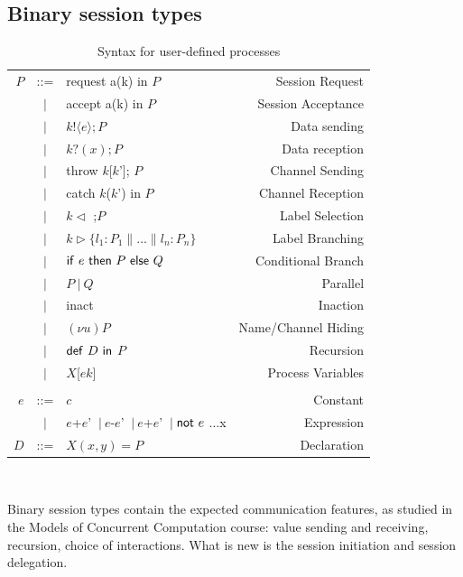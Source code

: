\documentclass[a4paper,11pt,twoside]{report}
\newcommand{\ptilde}[1]{{\ensuremath{#1}}}
\newcommand{\kf}[1]{\textup{\textsf{#1}}\xspace}
\newcommand{\Ic}{\ensuremath{c}}
\newcommand{\Iu}{\ensuremath{u}}
\newcommand{\Ik}{\ensuremath{k}}
\newcommand{\PP}{\ensuremath{P}}
\newcommand{\Q}{\ensuremath{Q}}
\newcommand{\DD}{\ensuremath{D}}
\newcommand{\e}{\ensuremath{e}}
\newcommand{\x}{\ensuremath{x}}
\newcommand{\pc}{\Par}
\newcommand{\X}{\ensuremath{X}}
\newcommand{\Xsignature}{\ensuremath{\X(\at{x}, \at{y})}}
\newcommand{\Ddef}{\ensuremath{\Xsignature=\PP}}
\newcommand{\defD}{\ensuremath{\kf{def}\ \DD \ \kf{in}\ }}
\newcommand{\ifthenelse}[3]{\ensuremath{\kf{if}\ #1\ \kf{then}\ #2\ \kf{else}\ #3}}
\newcommand{\nuc}[2]{\ensuremath{(\nu #1)#2}}
\newcommand{\NOT}[1]{\ensuremath{\kf{not}\ #1}}
\newcommand{\at}[1]{\ensuremath{\ptilde{#1}}}
\newcommand{\Par}{\ensuremath{\ |\ }}
\newcommand{\sep}{\ensuremath{~\mathbf{|}~ }}
\newcommand{\outS}[3]{\ensuremath{#1!\langle #2\rangle;#3}}
\newcommand{\inpS}[3]{\ensuremath{#1?( #2);#3}}
\begin{document}
\subsection{Binary session types}
\begin{table}[tb]
\centering
\begin{tabular}{rclr}
 \PP & ::=  &  request a(k) in \PP   &   {Session Request}\\
     & \sep & accept a(k) in \PP   &   {Session Acceptance}\\
     & \sep & \outS{\Ik}\e\PP &    {Data sending}\\
     & \sep & \inpS{\Ik}\x\PP &    {Data reception}\\
     & \sep & throw \Ik[\Ik']; \PP & {Channel Sending}\\
     & \sep & catch \Ik(\Ik') in \PP &  {Channel Reception}\\
     & \sep & \Ik $\vartriangleleft$ ;{\PP} & {Label Selection}\\
     & \sep & \Ik $\vartriangleright \{  l_{1}:{\PP}_{1} \| ... \|  l_{n}:{\PP}_{n} \} $ & {Label Branching}\\[1mm]
     & \sep & \ifthenelse{\e}{\PP}{\Q} & {Conditional Branch}\\
      & \sep & \PP \pc \Q  & {Parallel}\\
      & \sep & inact & {Inaction}\\
      & \sep & \nuc{\Iu}{\PP} & {Name/Channel Hiding}\\
      & \sep & \defD \PP & {Recursion}\\
      & \sep & \X[\e\Ik] & {Process Variables}
\\
\\[2mm]
\e   & ::= & \Ic & {Constant}  \\
&  \sep & \e+\e' \sep  \e-\e' \sep \e+\e' \sep\NOT{\e} $\ldots$x
&{Expression}\\
\DD   & ::= & \Ddef &{Declaration}\\
\end{tabular}
\ \vspace{1mm}
\caption{Syntax for user-defined processes}\label{tab:syntaxB}
\end{table}

Binary session types contain the expected communication features, as studied in the Models of Concurrent Computation course: value sending and receiving, recursion, choice of interactions. What is new is the session initiation and session delegation.
\end{document}
